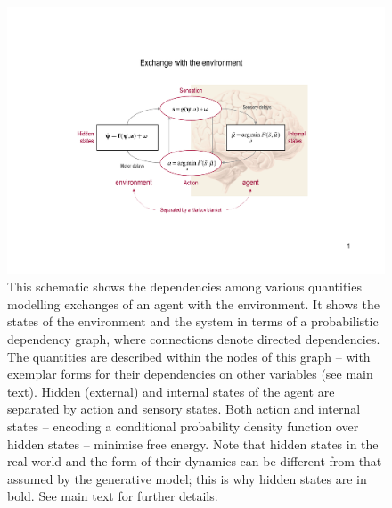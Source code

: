 \documentclass[a4paper]{article} %
\begin{document}
\begin{figure}%
 \centerline{%
\includegraphics[width=\columnwidth]{figure1.pdf}%
}%
\caption{This schematic shows the dependencies among various
quantities modelling exchanges of an agent with the environment. It
shows the states of the environment and the system in terms of a
probabilistic dependency graph, where connections denote directed
dependencies. The quantities are described within the nodes of this
graph -- with exemplar forms for their dependencies on other variables
(see main text). Hidden (external) and internal states of the agent are
separated by action and sensory states. Both action and internal states
-- encoding a conditional probability density function over hidden
states -- minimise free energy. Note that hidden states in the real
world and the form of their dynamics can be different from that assumed
by the generative model; this is why hidden states are in bold. See main
text for further details.
}%
\label{fig:figure1}
\end{figure}
\end{document}
